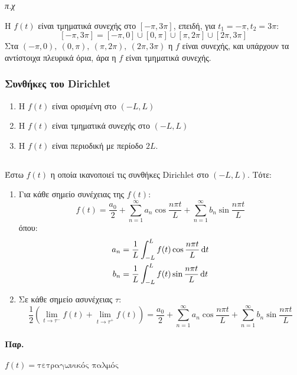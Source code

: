 \documentclass[11pt,a4paper,titlepage,draft]{article}
\begin{document}
\textit{π.χ}

Η \(f(t)\) είναι τμηματικά συνεχής στο \([-\pi,3\pi]\), επειδή, για \(t_1=-\pi,t_2=3\pi\):
\[
[-\pi,3\pi] = [-\pi,0] \cup [0,\pi] \cup [\pi,2\pi] \cup [2\pi,3\pi]
\]
Στα \( (-\pi,0),\ (0,\pi) ,\   (\pi,2\pi) ,\   (2\pi,3\pi)\) η \(f\) είναι συνεχής, και υπάρχουν τα αντίστοιχα πλευρικά όρια, %
άρα η \(f\) είναι τμηματικά συνεχής.

\subsubsection{Συνθήκες του \textlatin{Dirichlet}}
\begin{enumerate}
\item Η \(f(t)\) είναι ορισμένη στο \((-L,L)\)
\item Η \(f(t)\) είναι τμηματικά συνεχής στο \((-L,L)\)
\item Η \(f(t)\) είναι περιοδική με περίοδο \(2L\).
\end{enumerate}

\subsection*{}

\begin{theorem*}{}
Έστω \(f(t)\) η οποία ικανοποιεί τις συνθήκες \textlatin{Dirichlet} στο \((-L,L)\). Τότε:
\begin{enumerate}
\item
Για κάθε σημείο συνέχειας της \(f(t)\):
\[
f(t) = \frac{a_0}{2}+\sum_{n=1}^\infty a_n \cos \frac{n\pi t}{L}
+\sum_{n=1}^\infty b_n \sin \frac{n\pi t}{L}
\]
όπου:
\begin{align*}
a_n&=\frac{1}{L} \int_{-L}^L f(t) \cos \frac{n\pi t}{L} \dif t \\
b_n&=\frac{1}{L} \int_{-L}^L f(t) \sin \frac{n\pi t}{L} \dif t
\end{align*}

\item Σε κάθε σημείο ασυνέχειας \(\tau\):
\[
\frac{1}{2} \left( \lim_{t \to \tau^-}f(t) + \lim_{t \to \tau^+}f(t) \right) 
= \frac{a_0}{2}+\sum_{n=1}^\infty a_n \cos \frac{n\pi t}{L}
+\sum_{n=1}^\infty b_n \sin \frac{n\pi t}{L}
\]
\end{enumerate}

\end{theorem*}

\paragraph{Παρ.}
\(f(t) = \text{τετραγωνικός παλμός}\)
\end{document}
